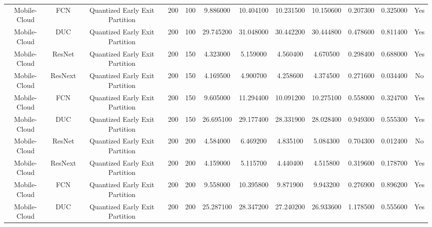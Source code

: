 \begin{tabular}{|c||c||c||c||c||c||c||c||c||c||c||c|}
Mobile-Cloud & FCN & Quantized Early Exit Partition & 200 & 100 & 9.886000 & 10.404100 & 10.231500 & 10.150600 & 0.207300 & 0.325000 & Yes \\
Mobile-Cloud & DUC & Quantized Early Exit Partition & 200 & 100 & 29.745200 & 31.048000 & 30.442200 & 30.444800 & 0.478600 & 0.811400 & Yes \\
Mobile-Cloud & ResNet & Quantized Early Exit Partition & 200 & 150 & 4.323000 & 5.159000 & 4.560400 & 4.670500 & 0.298400 & 0.688000 & Yes \\
Mobile-Cloud & ResNext & Quantized Early Exit Partition & 200 & 150 & 4.169500 & 4.900700 & 4.258600 & 4.374500 & 0.271600 & 0.034400 & No \\
Mobile-Cloud & FCN & Quantized Early Exit Partition & 200 & 150 & 9.605000 & 11.294400 & 10.091200 & 10.275100 & 0.558000 & 0.324700 & Yes \\
Mobile-Cloud & DUC & Quantized Early Exit Partition & 200 & 150 & 26.695100 & 29.177400 & 28.331900 & 28.028400 & 0.949300 & 0.555300 & Yes \\
Mobile-Cloud & ResNet & Quantized Early Exit Partition & 200 & 200 & 4.584000 & 6.469200 & 4.835100 & 5.084300 & 0.704300 & 0.012400 & No \\
Mobile-Cloud & ResNext & Quantized Early Exit Partition & 200 & 200 & 4.159000 & 5.115700 & 4.440400 & 4.515800 & 0.319600 & 0.178700 & Yes \\
Mobile-Cloud & FCN & Quantized Early Exit Partition & 200 & 200 & 9.558000 & 10.395800 & 9.871900 & 9.943200 & 0.276900 & 0.896200 & Yes \\
Mobile-Cloud & DUC & Quantized Early Exit Partition & 200 & 200 & 25.287100 & 28.347200 & 27.240200 & 26.933600 & 1.178500 & 0.555600 & Yes \\
\bottomrule
\end{tabular}
